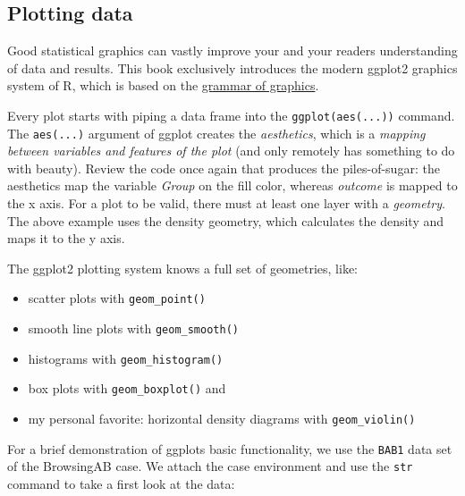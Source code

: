 \documentclass[]{svmono}
\newenvironment{Shaded}{\begin{snugshade}}{\end{snugshade}}
\newcommand{\KeywordTok}[1]{\textcolor[rgb]{0.13,0.29,0.53}{\textbf{#1}}}
\newcommand{\StringTok}[1]{\textcolor[rgb]{0.31,0.60,0.02}{#1}}
\newcommand{\OperatorTok}[1]{\textcolor[rgb]{0.81,0.36,0.00}{\textbf{#1}}}
\newcommand{\NormalTok}[1]{#1}
\providecommand{\tightlist}{%
  \setlength{\itemsep}{0pt}\setlength{\parskip}{0pt}}
\theoremstyle{definition}
\theoremstyle{definition}
\theoremstyle{definition}
\theoremstyle{remark}
\begin{document}
\subsection{Plotting data}\label{plotting-data}

Good statistical graphics can vastly improve your and your readers
understanding of data and results. This book exclusively introduces the
modern ggplot2 graphics system of R, which is based on the
\href{http://zevross.com/blog/2014/08/04/beautiful-plotting-in-r-a-ggplot2-cheatsheet-3/}{grammar
of graphics}.

Every plot starts with piping a data frame into the
\texttt{ggplot(aes(...))} command. The \texttt{aes(...)} argument of
ggplot creates the \emph{aesthetics}, which is a \emph{mapping between
variables and features of the plot} (and only remotely has something to
do with beauty). Review the code once again that produces the
piles-of-sugar: the aesthetics map the variable \emph{Group} on the fill
color, whereas \emph{outcome} is mapped to the x axis. For a plot to be
valid, there must at least one layer with a \emph{geometry}. The above
example uses the density geometry, which calculates the density and maps
it to the y axis.

The ggplot2 plotting system knows a full set of geometries, like:

\begin{itemize}
\tightlist
\item
  scatter plots with \texttt{geom\_point()}
\item
  smooth line plots with \texttt{geom\_smooth()}
\item
  histograms with \texttt{geom\_histogram()}
\item
  box plots with \texttt{geom\_boxplot()} and
\item
  my personal favorite: horizontal density diagrams with
  \texttt{geom\_violin()}
\end{itemize}

For a brief demonstration of ggplots basic functionality, we use the
\texttt{BAB1} data set of the BrowsingAB case. We attach the case
environment and use the \texttt{str} command to take a first look at the
data:

\begin{Shaded}
\end{Shaded}
\end{document}
